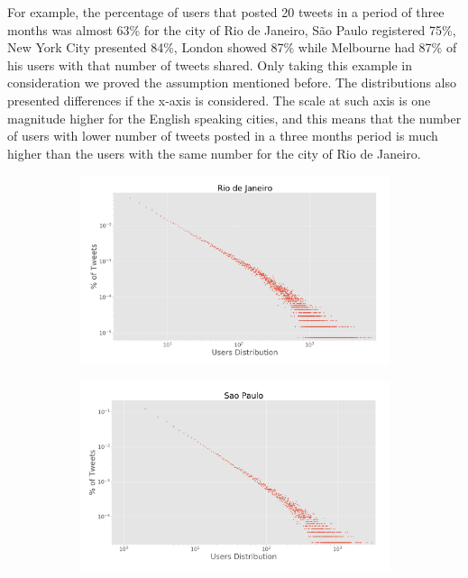 For example, the percentage of users that posted 20 tweets in a period of three months was almost 63\% for the city of Rio de Janeiro, São Paulo registered 75\%, New York City presented 84\%, London showed 87\% while Melbourne had 87\% of his users with that number of tweets shared. Only taking this example in consideration we proved the assumption mentioned before. The distributions also presented differences if the x-axis is considered. The scale at such axis is one magnitude higher for the English speaking cities, and this means that the number of users with lower number of tweets posted in a three months period is much higher than the users with the same number for the city of Rio de Janeiro.

\begin{figure}[h]
	\centering
	\begin{subfigure}[t]{0.45\textwidth}
		\centering
		\includegraphics[width=1\linewidth]{figures/rio_loglog_users.png}
		\caption{}
		\label{subfig:riodejaneiro_loglog_users}
	\end{subfigure}%
	\quad
	\begin{subfigure}[t]{0.45\textwidth}
		\centering
		\includegraphics[width=1\linewidth]{figures/sp_loglog_users.png}
		\caption{}
		\label{subfig:saopaulo_loglog_users}
	\end{subfigure}
	

\end{figure}

